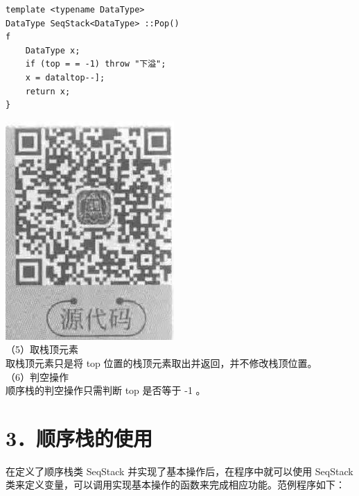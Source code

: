 \documentclass[10pt]{article}
\begin{document}
\begin{verbatim}
template <typename DataType>
DataType SeqStack<DataType> ::Pop()
f
    DataType x;
    if (top = = -1) throw "下溢";
    x = dataltop--];
    return x;
}
\end{verbatim}

\includegraphics[max width=\textwidth, center]{2025_06_06_704745ea57b15b2333e5g-087}\\
（5）取栈顶元素\\
取栈顶元素只是将 top 位置的栈顶元素取出并返回，并不修改栈顶位置。\\
（6）判空操作\\
顺序栈的判空操作只需判断 top 是否等于 -1 。

\section*{3．顺序栈的使用}
在定义了顺序栈类 SeqStack 并实现了基本操作后，在程序中就可以使用 SeqStack类来定义变量，可以调用实现基本操作的函数来完成相应功能。范例程序如下：
\end{document}
